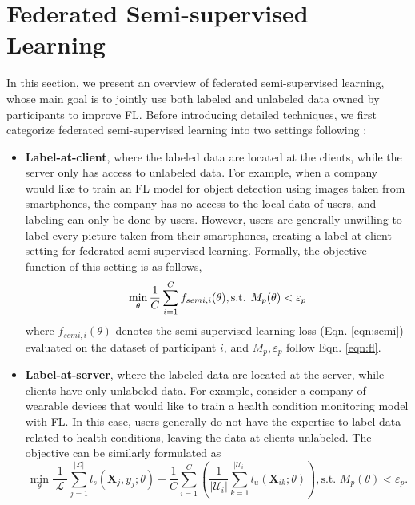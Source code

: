 \documentclass[11pt]{article}
\begin{document}
\section{Federated Semi-supervised Learning}
\label{sec:fed-semi}
In this section, we present an overview of federated semi-supervised learning, whose main goal is to jointly use both labeled and unlabeled data owned by participants to improve FL. Before introducing detailed techniques, we first categorize federated semi-supervised learning into two settings following \cite{jeong2021federated}: 
\begin{itemize}
    \item \textbf{Label-at-client}, where the labeled data are located at the clients, while the server only has access to unlabeled data. For example, when a company would like to train an FL model for object detection using images taken from smartphones, the company has no access to the local data of users, and labeling can only be done by users. However, users are generally unwilling to label every picture taken from their smartphones, creating a label-at-client setting for federated semi-supervised learning. Formally, the objective function of this setting is as follows, 
    \begin{equation}
        \min_{\theta} \frac{1}{C}\sum_{i=1}^Cf_{semi, i}(\theta), \text{s.t. } M_p(\theta)< \varepsilon_p\\
    \end{equation}
    where $f_{semi, i}(\theta)$ denotes the semi supervised learning loss (Eqn. \ref{eqn:semi}) evaluated on the dataset of participant $i$, and $M_p, \varepsilon_p$ follow Eqn. \ref{eqn:fl}. 
    \item \textbf{Label-at-server}, where the labeled data are located at the server, while clients have only unlabeled data. For example, consider a company of wearable devices that would like to train a health condition monitoring model with FL. In this case, users generally do not have the expertise to label data related to health conditions, leaving the data at clients unlabeled. The objective can be similarly formulated as 
    \begin{equation}
        \min_\theta \frac{1}{|\mathcal{L}|}\sum_{j=1}^{|\mathcal{L}|}l_s(\mathbf{X}_j, y_j;\theta) + \frac{1}{C}\sum_{i=1}^C\left(\frac{1}{|\mathcal{U}_i|}\sum_{k=1}^{|\mathcal{U}_i|}l_u(\mathbf{X}_{ik};\theta)\right), \text{s.t. }M_p(\theta)<\varepsilon_p. 
    \end{equation}
\end{itemize}
\end{document}

